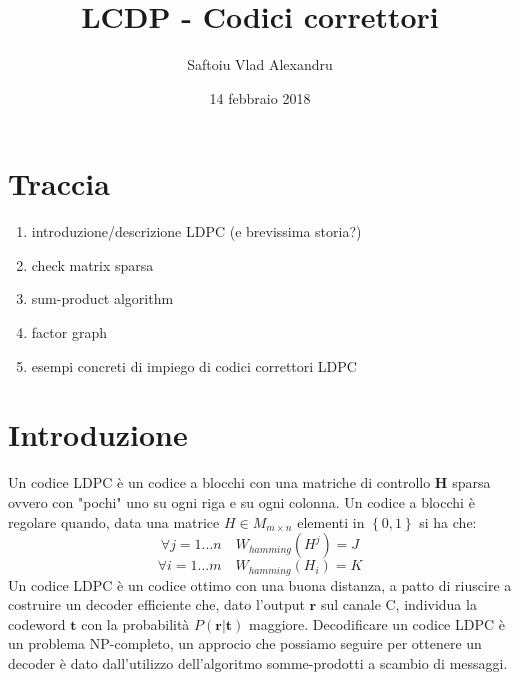 \documentclass{article}
\title{LCDP - Codici correttori}
\date{14 febbraio 2018}
\author{Saftoiu Vlad Alexandru}
\begin{document}
	\maketitle
	\newpage

	\tableofcontents
	\newpage


	\section{Traccia}
	\begin{enumerate}
		\item introduzione/descrizione LDPC (e brevissima storia?)
		\item check matrix sparsa 
		\item sum-product algorithm
		\item factor graph
		\item esempi concreti di impiego di codici correttori LDPC
	\end{enumerate}

	\section{Introduzione}
	Un codice LDPC è un codice a blocchi con una matriche di controllo $\textbf{H}$ sparsa ovvero con "pochi" uno su ogni riga e su ogni colonna. Un codice a blocchi è regolare quando, data una matrice $H \in M_{m \times n}$ elementi in $\left\{0,1\right\}$ si ha che:
	\begin{equation}
		  \forall j =1 ... n \quad W_{hamming}(H^j) = J 
	\end{equation}
	\begin{equation}
		\forall i = 1 ... m \quad W_{hamming}(H_i) = K
	\end{equation}
	Un codice LDPC è un codice ottimo con una buona distanza, a patto di riuscire a costruire un decoder efficiente che, dato l'output $\textbf{r}$ sul canale C, individua la codeword $\textbf{t}$ con la probabilità $P(\textbf{r}|\textbf{t})$ maggiore. Decodificare un codice LDPC è un problema NP-completo, un approcio che possiamo seguire per ottenere un decoder è dato dall'utilizzo dell'algoritmo somme-prodotti a scambio di messaggi.
\end{document}
